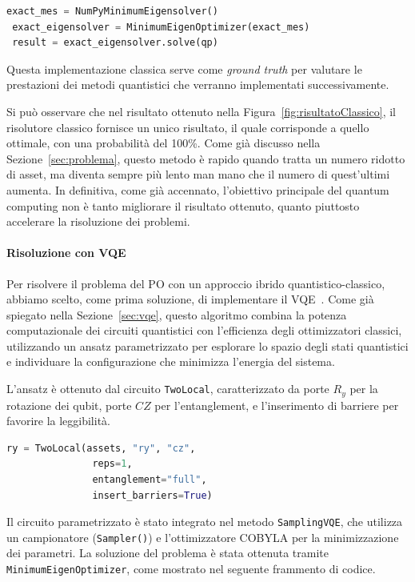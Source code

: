 \begin{lstlisting}[language=python, caption={Risoluzione classica del problema utilizzando \texttt{NumPyMinimumEigensolver.}}]
 exact_mes = NumPyMinimumEigensolver()
 exact_eigensolver = MinimumEigenOptimizer(exact_mes)
 result = exact_eigensolver.solve(qp)
\end{lstlisting}

Questa implementazione classica serve come \textit{ground truth} per 
valutare le prestazioni dei metodi quantistici che verranno 
implementati successivamente.

Si può osservare che nel risultato ottenuto nella Figura~\ref{fig:risultatoClassico}, il risolutore 
classico fornisce un unico risultato, il quale corrisponde a quello ottimale, con una probabilità 
del 100\%. Come già discusso nella Sezione~\ref{sec:problema}, questo metodo 
è rapido quando tratta un numero ridotto di asset, ma diventa sempre più lento 
man mano che il numero di quest'ultimi aumenta. In definitiva, come già accennato, 
l'obiettivo principale del quantum computing non è tanto migliorare il 
risultato ottenuto, quanto piuttosto accelerare la risoluzione dei problemi.

\paragraph{Risoluzione con VQE}
Per risolvere il problema del PO con un approccio ibrido quantistico-classico, 
abbiamo scelto, come prima soluzione, di implementare il VQE~\cite{qiskit_portfolio_optimization}. Come già spiegato 
nella Sezione~\ref{sec:vqe}, questo algoritmo combina la potenza computazionale 
dei circuiti quantistici con l'efficienza degli ottimizzatori classici, utilizzando 
un ansatz parametrizzato per esplorare lo spazio degli stati quantistici e 
individuare la configurazione che minimizza l'energia del sistema.

L'ansatz è ottenuto dal circuito \texttt{TwoLocal}, caratterizzato da porte $R_y$ per 
la rotazione dei qubit, porte $CZ$ per l'entanglement, e l'inserimento di barriere 
per favorire la leggibilità.

\begin{lstlisting}[language=python]
 ry = TwoLocal(assets, "ry", "cz", 
               reps=1, 
               entanglement="full", 
               insert_barriers=True)
\end{lstlisting}

Il circuito parametrizzato è stato integrato nel metodo \texttt{SamplingVQE}, che 
utilizza un campionatore (\texttt{Sampler()}) e l'ottimizzatore COBYLA per la 
minimizzazione dei parametri. La soluzione del problema è stata ottenuta tramite 
\texttt{MinimumEigenOptimizer}, come mostrato nel seguente frammento di codice.

